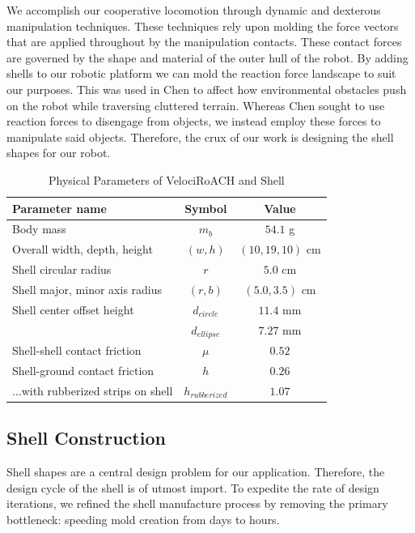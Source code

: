 \documentclass[letterpaper, 10 pt, conference]{ieeeconf}
\begin{document}
We accomplish our cooperative locomotion through dynamic and dexterous manipulation techniques.
These techniques rely upon molding the force vectors that are applied throughout by the manipulation contacts.
These contact forces are governed by the shape and material of the outer hull of the robot.
By adding shells to our robotic platform we can mold the reaction force landscape to suit our purposes.
This was used in Chen \cite{ChenTerradynamic} to affect how environmental obstacles push on the robot while traversing cluttered terrain.
Whereas Chen sought to use reaction forces to disengage from objects, we instead employ these forces to manipulate said objects.
Therefore, the crux of our work is designing the shell shapes for our robot.

\begin{table}[tb]
\renewcommand{\arraystretch}{1.1}
\caption{Physical Parameters of VelociRoACH and Shell}
\label{tab:Dimensions1}
\centering
\begin{tabular}{l c c}
\hline
Parameter name & Symbol & Value \\
\hline
Body mass & $m_b$ & $54.1$ g \\
Overall width, depth, height & $(w, h)$ & $(10, 19, 10)$ cm \\
Shell circular radius & $r$ & $5.0$ cm \\
Shell major, minor axis radius & $(r, b)$ & $(5.0, 3.5)$ cm \\
Shell center offset height & $d_{circle}$ & $11.4$ mm \\
                           & $d_{ellipse}$ & $7.27$ mm \\
Shell-shell contact friction & $\mu$ & $0.52$ \\
Shell-ground contact friction & $h$ & $0.26$ \\
...with rubberized strips on shell  & $h_{rubberized}$ & $1.07$ \\
\hline
\end{tabular}
\end{table}

\subsection{Shell Construction}
Shell shapes are a central design problem for our application. Therefore, the design cycle of the shell is of utmost import.
To expedite the rate of design iterations, we refined the shell manufacture process by removing the primary bottleneck: speeding mold creation from days to hours.
\end{document}
